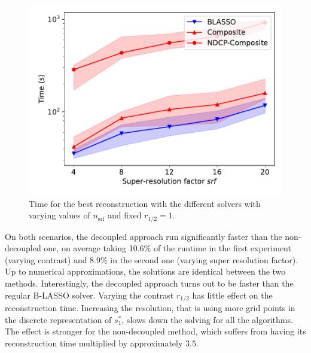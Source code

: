         \begin{figure}[t]
            \centering
            \includegraphics[width=.7\linewidth]{figures/benchmark/time_vs_srf.pdf}        
            \caption{Time for the best reconstruction with the different solvers with varying values of $n_\mathrm{srf}$ and fixed $r_{1/2}=1$.}
            \label{fig:time-vs-srf}
        \end{figure}
    
        On both scenarios, the decoupled approach run significantly faster than the non-decoupled one, on average taking 10.6\% of the runtime in the first experiment (varying contrast) and 8.9\% in the second one (varying super resolution factor). Up to numerical approximations, the solutions are identical between the two methods. Interestingly, the decoupled approach turns out to be faster than the regular B-LASSO solver. Varying the contrast $r_{1/2}$ has little effect on the reconstruction time. Increasing the resolution, that is using more grid points in the discrete representation of $s_1^*$, slows down the solving for all the algorithms. The effect is stronger for the non-decoupled method, which suffers from having its reconstruction time multiplied by approximately $3.5$.

        